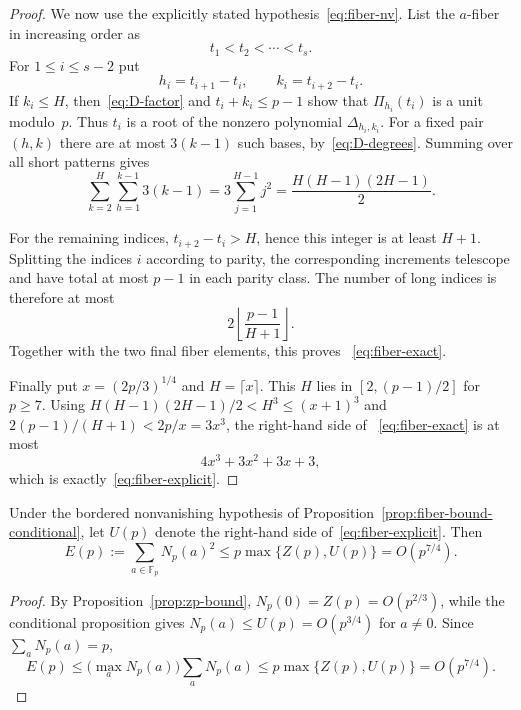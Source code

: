 \begin{proof}
We now use the explicitly stated hypothesis~\eqref{eq:fiber-nv}.  List
the $a$-fiber in increasing order as
\[
 t_1<t_2<\cdots<t_s.
\]
For $1\leq i\leq s-2$ put
\[
 h_i=t_{i+1}-t_i,\qquad k_i=t_{i+2}-t_i.
\]
If $k_i\leq H$, then~\eqref{eq:D-factor} and
$t_i+k_i\leq p-1$ show that $\Pi_{h_i}(t_i)$ is a unit modulo~$p$.
Thus $t_i$ is a root of the nonzero polynomial
$\Delta_{h_i,k_i}$.  For a fixed pair $(h,k)$ there are at most
$3(k-1)$ such bases, by~\eqref{eq:D-degrees}.  Summing over all short
patterns gives
\begin{equation}
 \sum_{k=2}^H\sum_{h=1}^{k-1}3(k-1)
 =3\sum_{j=1}^{H-1}j^2
 =\frac{H(H-1)(2H-1)}2.                       \label{eq:short-count}
\end{equation}

For the remaining indices, $t_{i+2}-t_i>H$, hence this integer is at
least $H+1$.  Splitting the indices $i$ according to parity, the
corresponding increments telescope and have total at most $p-1$ in each
parity class.  The number of long indices is therefore at most
\[
 2\left\lfloor\frac{p-1}{H+1}\right\rfloor.
\]
Together with the two final fiber elements, this proves
~\eqref{eq:fiber-exact}.

Finally put $x=(2p/3)^{1/4}$ and $H=\lceil x\rceil$.  This $H$ lies in
$[2,(p-1)/2]$ for $p\geq7$.  Using
$H(H-1)(2H-1)/2<H^3\leq(x+1)^3$ and
$2(p-1)/(H+1)<2p/x=3x^3$, the right-hand side of
~\eqref{eq:fiber-exact} is at most
\[
 4x^3+3x^2+3x+3,
\]
which is exactly~\eqref{eq:fiber-explicit}.
\end{proof}

\begin{corollary}
\label{cor:fiber-energy-conditional}
Under the bordered nonvanishing hypothesis of
Proposition~\ref{prop:fiber-bound-conditional}, let $U(p)$ denote the
right-hand side of~\eqref{eq:fiber-explicit}.  Then
\[
 E(p):=\sum_{a\in\mathbb F_p}N_p(a)^2
 \leq p\max\{Z(p),U(p)\}=O(p^{7/4}).
\]
\end{corollary}

\begin{proof}
By Proposition~\ref{prop:zp-bound}, $N_p(0)=Z(p)=O(p^{2/3})$, while the
conditional proposition gives $N_p(a)\leq U(p)=O(p^{3/4})$ for
$a\ne0$.  Since $\sum_aN_p(a)=p$,
\[
 E(p)\leq\bigl(\max_aN_p(a)\bigr)\sum_aN_p(a)
       \leq p\max\{Z(p),U(p)\}=O(p^{7/4}).
\]
\end{proof}
